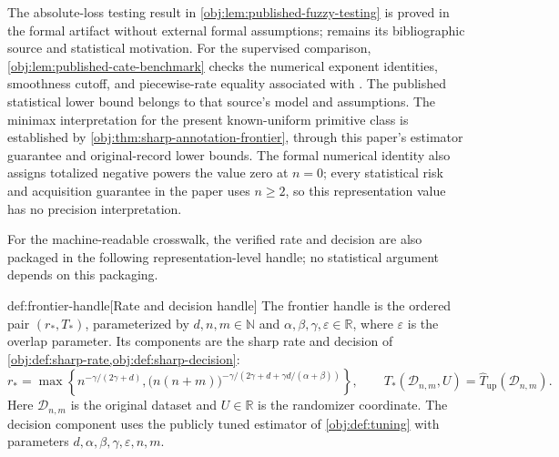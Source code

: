 The absolute-loss testing result in \cref{obj:lem:published-fuzzy-testing} is proved in the formal artifact without external formal assumptions; \citet[Section 3, Lemma 1]{KennedyBalakrishnanRobinsWasserman2024} remains its bibliographic source and statistical motivation. For the supervised comparison, \cref{obj:lem:published-cate-benchmark} checks the numerical exponent identities, smoothness cutoff, and piecewise-rate equality associated with \citet[Section 3, Theorem 1]{KennedyBalakrishnanRobinsWasserman2024}. The published statistical lower bound belongs to that source's model and assumptions. The minimax interpretation for the present known-uniform primitive class is established by \cref{obj:thm:sharp-annotation-frontier}, through this paper's estimator guarantee and original-record lower bounds. The formal numerical identity also assigns totalized negative powers the value zero at \(n=0\); every statistical risk and acquisition guarantee in the paper uses \(n\ge2\), so this representation value has no precision interpretation.

For the machine-readable crosswalk, the verified rate and decision are also packaged in the following representation-level handle; no statistical argument depends on this packaging.

\begin{definitionv}{def:frontier-handle}[Rate and decision handle]
The frontier handle is the ordered pair \((r_*,T_*)\), parameterized by \(d,n,m\in\mathbb N\) and \(\alpha,\beta,\gamma,\varepsilon\in\mathbb R\), where \(\varepsilon\) is the overlap parameter. Its components are the sharp rate and decision of \cref{obj:def:sharp-rate,obj:def:sharp-decision}:
\[
r_*=
\max\left\{
n^{-\gamma/(2\gamma+d)},
\bigl(n(n+m)\bigr)^{-\gamma/(2\gamma+d+\gamma d/(\alpha+\beta))}
\right\},
\qquad
T_*(\mathcal D_{n,m},U)
=
\widehat T_{\mathrm{up}}(\mathcal D_{n,m}).
\]
Here \(\mathcal D_{n,m}\) is the original dataset and \(U\in\mathbb R\) is the randomizer coordinate. The decision component uses the publicly tuned estimator of \cref{obj:def:tuning} with parameters \(d,\alpha,\beta,\gamma,\varepsilon,n,m\).
\end{definitionv}

